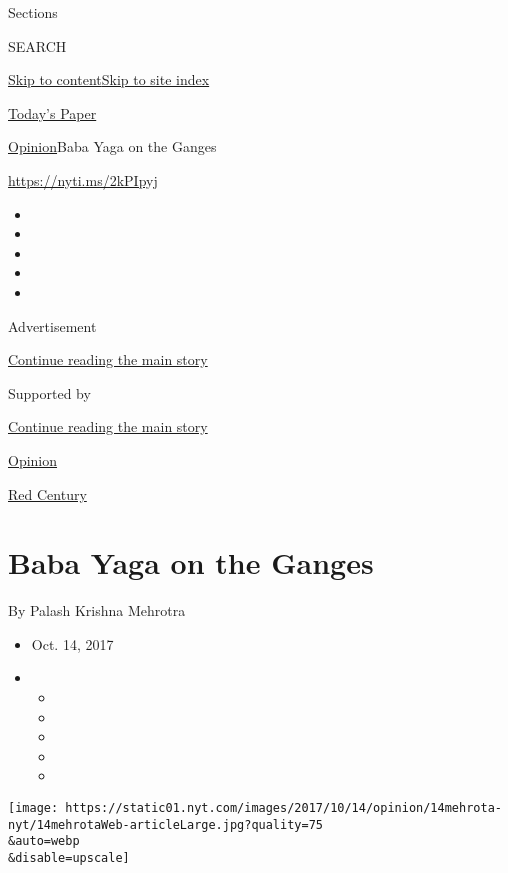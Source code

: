 Sections

SEARCH

\protect\hyperlink{site-content}{Skip to
content}\protect\hyperlink{site-index}{Skip to site index}

\href{https://myaccount.nytimes.com/auth/login?response_type=cookie\&client_id=vi}{}

\href{https://www.nytimes.com/section/todayspaper}{Today's Paper}

\href{/section/opinion}{Opinion}\textbar{}Baba Yaga on the Ganges

\href{https://nyti.ms/2kPIpyj}{https://nyti.ms/2kPIpyj}

\begin{itemize}
\item
\item
\item
\item
\item
\end{itemize}

Advertisement

\protect\hyperlink{after-top}{Continue reading the main story}

Supported by

\protect\hyperlink{after-sponsor}{Continue reading the main story}

\href{/section/opinion}{Opinion}

\href{/column/red-century}{Red Century}

\hypertarget{baba-yaga-on-the-ganges}{%
\section{Baba Yaga on the Ganges}\label{baba-yaga-on-the-ganges}}

By Palash Krishna Mehrotra

\begin{itemize}
\item
  Oct. 14, 2017
\item
  \begin{itemize}
  \item
  \item
  \item
  \item
  \item
  \end{itemize}
\end{itemize}

\texttt{[image: https://static01.nyt.com/images/2017/10/14/opinion/14mehrota-nyt/14mehrotaWeb-articleLarge.jpg?quality=75\\\&auto=webp\\\&disable=upscale]}

